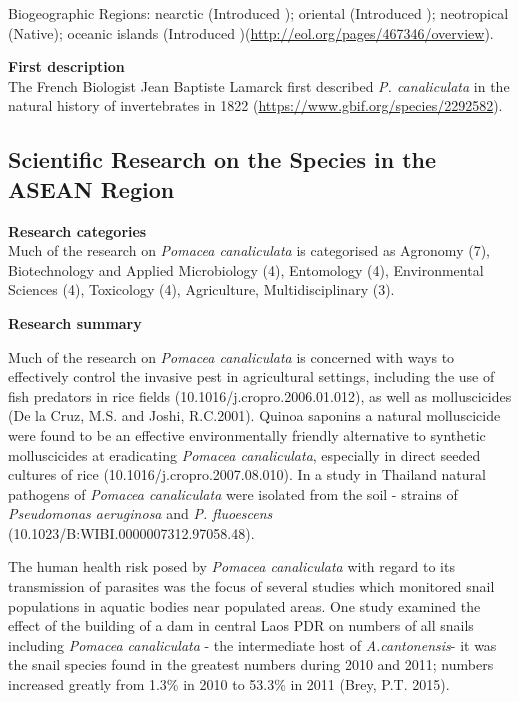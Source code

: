 \documentclass[]{book}
\theoremstyle{definition}
\theoremstyle{definition}
\theoremstyle{definition}
\theoremstyle{remark}
\begin{document}
Biogeographic Regions: nearctic (Introduced ); oriental (Introduced );
neotropical (Native); oceanic islands (Introduced
)(\url{http://eol.org/pages/467346/overview}).

\textbf{First description}\\
The French Biologist Jean Baptiste Lamarck first described \emph{P.
canaliculata} in the natural history of invertebrates in 1822
(\url{https://www.gbif.org/species/2292582}).

\hypertarget{scientific-research-on-the-species-in-the-asean-region-5}{%
\subsection{Scientific Research on the Species in the ASEAN
Region}\label{scientific-research-on-the-species-in-the-asean-region-5}}

\textbf{Research categories}\\
Much of the research on \emph{Pomacea canaliculata} is categorised as
Agronomy (7), Biotechnology and Applied Microbiology (4), Entomology
(4), Environmental Sciences (4), Toxicology (4), Agriculture,
Multidisciplinary (3).

\textbf{Research summary}

Much of the research on \emph{Pomacea canaliculata} is concerned with
ways to effectively control the invasive pest in agricultural settings,
including the use of fish predators in rice fields
(10.1016/j.cropro.2006.01.012), as well as molluscicides (De la Cruz,
M.S. and Joshi, R.C.2001). Quinoa saponins a natural molluscicide were
found to be an effective environmentally friendly alternative to
synthetic molluscicides at eradicating \emph{Pomacea canaliculata},
especially in direct seeded cultures of rice
(10.1016/j.cropro.2007.08.010). In a study in Thailand natural pathogens
of \emph{Pomacea canaliculata} were isolated from the soil - strains of
\emph{Pseudomonas aeruginosa} and \emph{P. fluoescens}
(10.1023/B:WIBI.0000007312.97058.48).

The human health risk posed by \emph{Pomacea canaliculata} with regard
to its transmission of parasites was the focus of several studies which
monitored snail populations in aquatic bodies near populated areas. One
study examined the effect of the building of a dam in central Laos PDR
on numbers of all snails including \emph{Pomacea canaliculata} - the
intermediate host of \emph{A.cantonensis}- it was the snail species
found in the greatest numbers during 2010 and 2011; numbers increased
greatly from 1.3\% in 2010 to 53.3\% in 2011 (Brey, P.T. 2015).
\end{document}
